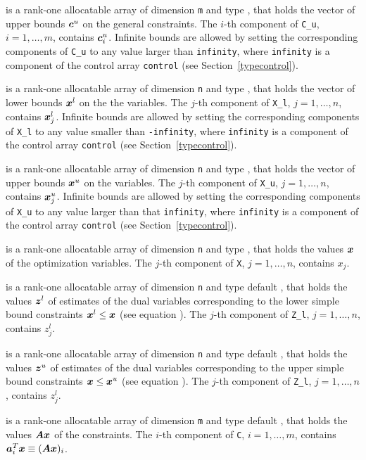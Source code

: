 \documentclass{galahad}
\begin{document}
\begin{description}
 is a rank-one allocatable array of dimension {\tt m} and type 
\realdp, that holds the vector of upper bounds ${\bm{c}}^{u}$ 
on the general constraints. The $i$-th component of 
{\tt C\_u}, $i = 1,  \ldots ,  m$, contains ${\bm{c}}_{i}^{u}$.
Infinite bounds are allowed by setting the corresponding 
components of {\tt C\_u} to any value larger than {\tt infinity}, 
where {\tt infinity} is a component of the control array {\tt control} 
(see Section~\ref{typecontrol}).

 is a rank-one allocatable array of dimension {\tt n} and type 
\realdp, that holds
the vector of lower bounds ${\bm{x}}^{l}$ on the the variables.
The $j$-th component of {\tt X\_l}, $j = 1, \ldots , n$, 
contains ${\bm{x}}_{j}^{l}$.
Infinite bounds are allowed by setting the corresponding 
components of {\tt X\_l} to any value smaller than {\tt -infinity}, 
where {\tt infinity} is a component of the control array {\tt control} 
(see Section~\ref{typecontrol}).

 is a rank-one allocatable array of dimension {\tt n} and type 
\realdp, that holds
the vector of upper bounds ${\bm{x}}^{u}$ on the variables.
The $j$-th component of {\tt X\_u}, $j = 1, \ldots , n$, 
contains ${\bm{x}}_{j}^{u}$.
Infinite bounds are allowed by setting the corresponding 
components of {\tt X\_u} to any value larger than that {\tt infinity}, 
where {\tt infinity} is a component of the control array {\tt control} 
(see Section~\ref{typecontrol}).

 is a rank-one allocatable array of dimension {\tt n} and type 
\realdp, 
that holds the values ${\bm{x}}$ of the optimization variables.
The $j$-th component of {\tt X}, $j = 1,  \ldots , n$, contains $x_{j}$.  

 is a rank-one allocatable array of dimension {\tt n} and type default 
\realdp, that holds
the values ${\bm{z}}^{l}$ of estimates  of the dual variables 
corresponding to the lower simple bound constraints ${\bm{x}}^{l} \leq {\bm{x}}$
(see equation ).
The $j$-th component of {\tt Z\_l}, $j = 1,  \ldots ,  n$, 
contains $z_{j}^{l}$.  

 is a rank-one allocatable array of dimension {\tt n} and type default 
\realdp, that holds
the values ${\bm{z}}^{u}$ of estimates  of the dual variables 
corresponding to the upper simple bound constraints ${\bm{x}} \leq {\bm{x}}^{u}$
(see equation ).
The $j$-th component of {\tt Z\_l}, $j = 1,  \ldots ,  n$, 
contains $z_{j}^{l}$.  

 is a rank-one allocatable array of dimension {\tt m} and type default 
\realdp, that holds
the values ${\bm{A}} {\bm{x}}$ of the constraints.
The $i$-th component of {\tt C}, $i = 1,  \ldots ,  m$, contains 
${\bm{a}}_{i}^{T}{\bm{x}} \equiv ({\bm{A}} {\bm{x}})_{i}$.  


\end{description}
\end{document}

